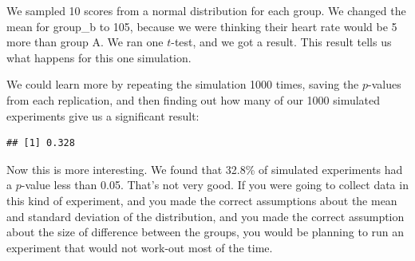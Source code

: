 \documentclass[
]{book}
\newenvironment{Shaded}{\begin{snugshade}}{\end{snugshade}}
\newcommand{\AttributeTok}[1]{\textcolor[rgb]{0.13,0.29,0.53}{#1}}
\newcommand{\ConstantTok}[1]{\textcolor[rgb]{0.56,0.35,0.01}{#1}}
\newcommand{\ControlFlowTok}[1]{\textcolor[rgb]{0.13,0.29,0.53}{\textbf{#1}}}
\newcommand{\DecValTok}[1]{\textcolor[rgb]{0.00,0.00,0.81}{#1}}
\newcommand{\FloatTok}[1]{\textcolor[rgb]{0.00,0.00,0.81}{#1}}
\newcommand{\FunctionTok}[1]{\textcolor[rgb]{0.13,0.29,0.53}{\textbf{#1}}}
\newcommand{\NormalTok}[1]{#1}
\newcommand{\OtherTok}[1]{\textcolor[rgb]{0.56,0.35,0.01}{#1}}
\newcommand{\SpecialCharTok}[1]{\textcolor[rgb]{0.81,0.36,0.00}{\textbf{#1}}}
\begin{document}
We sampled 10 scores from a normal distribution for each group. We changed the mean for group\_b to 105, because we were thinking their heart rate would be 5 more than group A. We ran one \(t\)-test, and we got a result. This result tells us what happens for this one simulation.

We could learn more by repeating the simulation 1000 times, saving the \(p\)-values from each replication, and then finding out how many of our 1000 simulated experiments give us a significant result:

\begin{Shaded}
\end{Shaded}

\begin{verbatim}
## [1] 0.328
\end{verbatim}

Now this is more interesting. We found that 32.8\% of simulated experiments had a \(p\)-value less than 0.05. That's not very good. If you were going to collect data in this kind of experiment, and you made the correct assumptions about the mean and standard deviation of the distribution, and you made the correct assumption about the size of difference between the groups, you would be planning to run an experiment that would not work-out most of the time.
\end{document}
